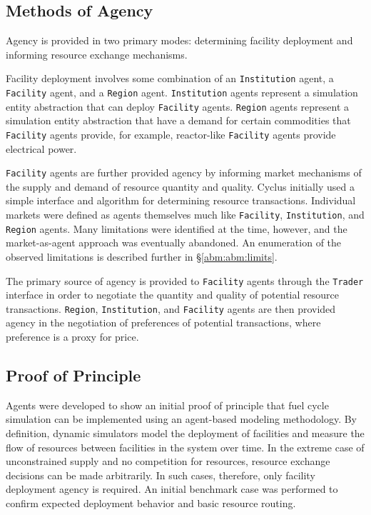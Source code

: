 \subsection{Methods of Agency}\label{abm:abm:agent}

Agency is provided in two primary modes: determining facility deployment and
informing resource exchange mechanisms. 

Facility deployment involves some combination of an \texttt{Institution} agent, a
\texttt{Facility} agent, and a \texttt{Region} agent. \texttt{Institution} agents
represent a simulation entity abstraction that can deploy \texttt{Facility}
agents. \texttt{Region} agents represent a simulation entity abstraction that have
a demand for certain commodities that \texttt{Facility} agents provide, for
example, reactor-like \texttt{Facility} agents provide electrical power.

\texttt{Facility} agents are further provided agency by informing market
mechanisms of the supply and demand of resource quantity and quality. Cyclus
initially used a simple interface and algorithm for determining resource
transactions. Individual markets were defined as agents themselves much like
\texttt{Facility}, \texttt{Institution}, and \texttt{Region} agents. Many limitations
were identified at the time, however, and the market-as-agent approach was
eventually abandoned. An enumeration of the observed limitations is described
further in \S \ref{abm:abm:limits}.

The primary source of agency is provided to \texttt{Facility} agents through the
\texttt{Trader} interface in order to negotiate the quantity and quality of
potential resource transactions. \texttt{Region}, \texttt{Institution}, and
\texttt{Facility} agents are then provided agency in the negotiation of
preferences of potential transactions, where preference is a proxy for price.

\subsection{Proof of Principle}\label{abm:abm:proof}

Agents were developed to show an initial proof of principle that fuel cycle
simulation can be implemented using an agent-based modeling methodology. By
definition, dynamic simulators model the deployment of facilities and measure
the flow of resources between facilities in the system over time. In the extreme
case of unconstrained supply and no competition for resources, resource exchange
decisions can be made arbitrarily. In such cases, therefore, only facility
deployment agency is required. An initial benchmark case was performed to
confirm expected deployment behavior and basic resource routing.

